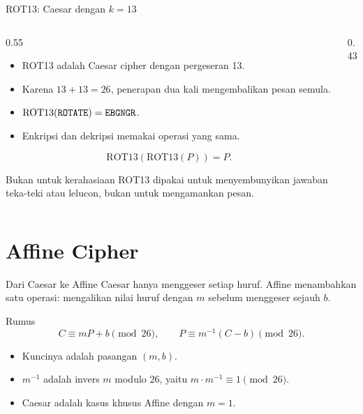 \documentclass[aspectratio=169,11pt]{beamer}
\begin{document}
\begin{frame}{ROT13: Caesar dengan $k=13$}
    \begin{columns}[T,onlytextwidth]
        \begin{column}{0.55\textwidth}
            \begin{itemize}
                \item ROT13 adalah Caesar cipher dengan pergeseran 13.
                \item Karena $13+13=26$, penerapan dua kali mengembalikan
                      pesan semula.
                \item $\mathrm{ROT13}(\texttt{ROTATE})=\texttt{EBGNGR}$.
                \item Enkripsi dan dekripsi memakai operasi yang sama.
            \end{itemize}
            \[
                \mathrm{ROT13}(\mathrm{ROT13}(P))=P.
            \]
            \begin{alertblock}{Bukan untuk kerahasiaan}
                \footnotesize
                ROT13 dipakai untuk menyembunyikan jawaban teka-teki atau
                lelucon, bukan untuk mengamankan pesan.
            \end{alertblock}
        \end{column}
        \begin{column}{0.43\textwidth}
            \centering
        \end{column}
    \end{columns}
\end{frame}

\section{Affine Cipher}

\begin{frame}{Dari Caesar ke Affine}
    Caesar hanya menggeser setiap huruf. Affine menambahkan satu operasi:
    mengalikan nilai huruf dengan $m$ sebelum menggeser sejauh $b$.
    \begin{block}{Rumus}
        \[
            C \equiv mP+b \pmod{26}, \qquad
            P \equiv m^{-1}(C-b) \pmod{26}.
        \]
    \end{block}
    \begin{itemize}
        \item Kuncinya adalah pasangan $(m,b)$.
        \item $m^{-1}$ adalah invers $m$ modulo 26, yaitu
              $m\cdot m^{-1}\equiv 1\pmod{26}$.
        \item Caesar adalah kasus khusus Affine dengan $m=1$.
    \end{itemize}
\end{frame}
\end{document}
